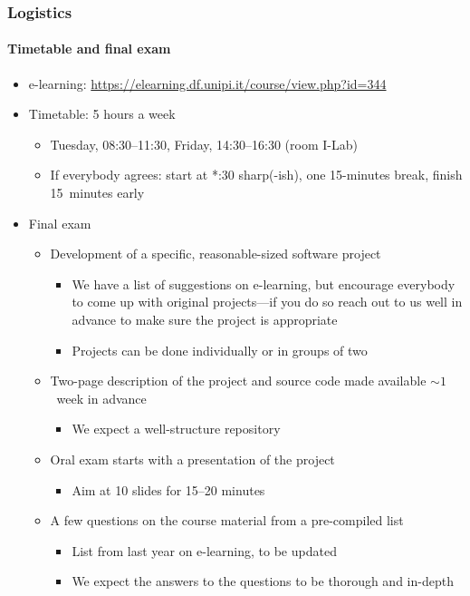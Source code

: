 \documentclass[9pt]{beamer}
\begin{document}
\begin{frame}
  \frametitle{Logistics}
  \framesubtitle{Timetable and final exam}
  \begin{itemize}
  \item e-learning: {\scriptsize \url{https://elearning.df.unipi.it/course/view.php?id=344}}
  \item Timetable: 5 hours a week
    \begin{itemize}
    \item \alert{Tuesday, 08:30--11:30, Friday, 14:30--16:30 (room I-Lab)}
    \item If everybody agrees: start at *:30 sharp(-ish), one 15-minutes break,
      finish 15~minutes early
    \end{itemize}
  \item Final exam
    \begin{itemize}
    \item Development of a specific, reasonable-sized \alert{software project}
    \begin{itemize}
      \item We have a list of suggestions on e-learning, but encourage everybody
        to come up with original projects---\alert{if you do so reach out to us
        well in advance to make sure the project is appropriate}
      \item Projects can be done \alert{individually or in groups of two}
    \end{itemize}
    \item Two-page description of the project and source code made
      available $\sim 1$~week in advance
      \begin{itemize}
        \item We expect a well-structure repository
      \end{itemize}
    \item Oral exam starts with a presentation of the project
    \begin{itemize}
      \item Aim at 10 slides for 15--20 minutes
    \end{itemize}
    \item \alert{A few questions on the course material from a pre-compiled list}
    \begin{itemize}
      \item List from last year on e-learning, to be updated
      \item We expect the answers to the questions to be thorough and in-depth
    \end{itemize}
    \end{itemize}
  \end{itemize}
\end{frame}
\end{document}
